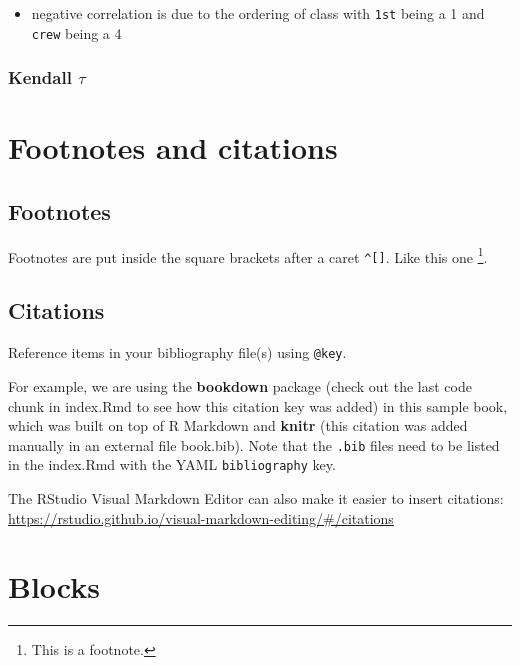 \documentclass[
]{book}
\providecommand{\tightlist}{%
  \setlength{\itemsep}{0pt}\setlength{\parskip}{0pt}}
\theoremstyle{definition}
\theoremstyle{definition}
\theoremstyle{definition}
\theoremstyle{definition}
\theoremstyle{remark}
\begin{document}
\begin{itemize}
\tightlist
\item
  negative correlation is due to the ordering of class with \texttt{1st} being a 1 and \texttt{crew} being a 4
\end{itemize}

\hypertarget{kendall-tau}{%
\subsection{\texorpdfstring{Kendall \(\tau\)}{Kendall \textbackslash tau}}\label{kendall-tau}}

\hypertarget{footnotes-and-citations}{%
\chapter{Footnotes and citations}\label{footnotes-and-citations}}

\hypertarget{footnotes}{%
\section{Footnotes}\label{footnotes}}

Footnotes are put inside the square brackets after a caret \texttt{\^{}{[}{]}}. Like this one \footnote{This is a footnote.}.

\hypertarget{citations}{%
\section{Citations}\label{citations}}

Reference items in your bibliography file(s) using \texttt{@key}.

For example, we are using the \textbf{bookdown} package \citep{R-bookdown} (check out the last code chunk in index.Rmd to see how this citation key was added) in this sample book, which was built on top of R Markdown and \textbf{knitr} \citep{xie2015} (this citation was added manually in an external file book.bib).
Note that the \texttt{.bib} files need to be listed in the index.Rmd with the YAML \texttt{bibliography} key.

The RStudio Visual Markdown Editor can also make it easier to insert citations: \url{https://rstudio.github.io/visual-markdown-editing/\#/citations}

\hypertarget{blocks}{%
\chapter{Blocks}\label{blocks}}
\end{document}
